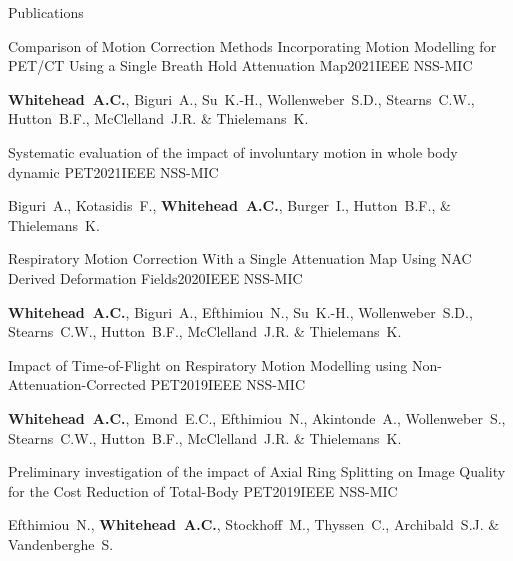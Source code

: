 \documentclass{cv}
\begin{document}
\begin{rSection}{Publications}
        \begin{rSubsection}{Comparison of Motion Correction Methods Incorporating Motion Modelling for PET/CT Using a Single Breath Hold Attenuation Map}{2021}{IEEE NSS-MIC}{}
            \item {\bf Whitehead~A.C.}, Biguri~A., Su~K.-H., Wollenweber~S.D., Stearns~C.W., Hutton~B.F., McClelland~J.R. \& Thielemans~K.
        \end{rSubsection}
        
        \begin{rSubsection}{Systematic evaluation of the impact of involuntary motion in whole body dynamic PET}{2021}{IEEE NSS-MIC}{}
            \item Biguri~A., Kotasidis~F., {\bf Whitehead~A.C.}, Burger~I., Hutton~B.F., \& Thielemans~K.
        \end{rSubsection}
        
        \begin{rSubsection}{Respiratory Motion Correction With a Single Attenuation Map Using NAC Derived Deformation Fields}{2020}{IEEE NSS-MIC}{}
            \item {\bf Whitehead~A.C.}, Biguri~A., Efthimiou~N., Su~K.-H., Wollenweber~S.D., Stearns~C.W., Hutton~B.F., McClelland~J.R. \& Thielemans~K.
        \end{rSubsection}
        
        \begin{rSubsection}{Impact of Time-of-Flight on Respiratory Motion Modelling using Non-Attenuation-Corrected \newline PET}{2019}{IEEE NSS-MIC}{}
            \item {\bf Whitehead~A.C.}, Emond~E.C., Efthimiou~N., Akintonde~A., Wollenweber~S., Stearns~C.W., Hutton~B.F., McClelland~J.R. \& Thielemans~K.
        \end{rSubsection}
        
        \begin{rSubsection}{ Preliminary investigation of the impact of Axial Ring Splitting on Image Quality for the Cost Reduction of Total-Body PET}{2019}{IEEE NSS-MIC}{}
            \item Efthimiou~N., {\bf Whitehead~A.C.}, Stockhoff~M., Thyssen~C., Archibald~S.J. \& Vandenberghe~S.
        \end{rSubsection}
    \end{rSection}
    
\end{document}
